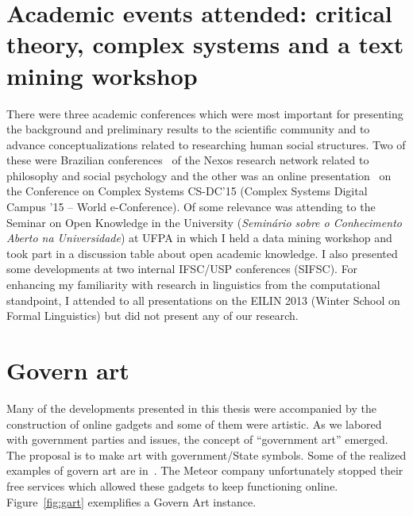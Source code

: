 \begin{apendicesenv}
\section{Academic events attended: critical theory, complex systems and a text mining workshop}\label{ap:anphy}
There were three academic conferences
which were most important for presenting the background and preliminary results to the scientific community
and to advance conceptualizations related to researching human social structures.
Two of these were Brazilian conferences~\cite{50uni,IICri} of the Nexos research network related to philosophy and social psychology
and the other was an online presentation~\cite{ccs15} on the Conference on Complex Systems CS-DC'15
(Complex Systems Digital Campus ’15 – World e-Conference).
Of some relevance was attending to the Seminar on Open Knowledge in the University
(\emph{Seminário sobre o Conhecimento Aberto na Universidade}) at UFPA
in which I held a data mining workshop and took part in a discussion table about open academic knowledge.
I also presented some developments at two internal IFSC/USP conferences (SIFSC).
For enhancing my familiarity with research in linguistics from the computational standpoint,
I attended to all presentations on the EILIN 2013 (Winter School on Formal Linguistics)
but did not present any of our research.

\section{Govern art}\label{sec:govArt}
Many of the developments presented in this thesis were accompanied by the construction of online gadgets
and some of them were artistic.
As we labored with government parties and issues,
the concept of ``government art'' emerged.
The proposal is to make art with government/State symbols.
Some of the realized examples of govern art are in~\cite{aars}.
The Meteor company unfortunately stopped their free services which
allowed these gadgets to keep functioning online.
Figure~\ref{fig:gart} exemplifies a Govern Art instance.


\end{apendicesenv}
